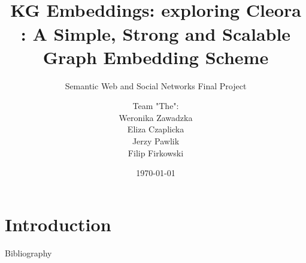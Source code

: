 \documentclass{clbeamer2024}
\title{\\[2\baselineskip]KG Embeddings: exploring Cleora \cite{rychalska2021cleorasimplestrongscalable}: A Simple, Strong and Scalable Graph Embedding Scheme}
\subtitle{Semantic Web and Social Networks Final Project}
\author{
    \begin{tabular}{c}
        Team "The": \\[0.2cm]
        Weronika Zawadzka \\ 
        Eliza Czaplicka \\ 
        Jerzy Pawlik \\ 
        Filip Firkowski
    \end{tabular}
}
\date{\today}
\begin{document}
\setcounter{framenumber}{-1}
\frame{\titlepage}

\section{Introduction}




\begin{frame}{Bibliography}
{\raggedright\sloppy\small}
\end{frame}
\end{document}
